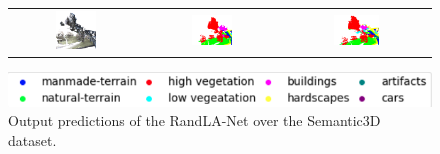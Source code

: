 \begin{figure}[h!]
\begin{tabular}{ccc}
            \includegraphics[width=0.33\textwidth, height=0.18\textheight]{images/seg_output/sem3d_seg_output/3_RGB.png} &
            \includegraphics[width=0.33\textwidth, height=0.18\textheight]{images/seg_output/sem3d_seg_output/3_GT.png}& 
            \includegraphics[width=0.33\textwidth, height=0.18\textheight]{images/seg_output/sem3d_seg_output/3_Pred.png}\\
        \end{tabular}
        \includegraphics[scale=0.65]{images/legend.png}
        \caption{Output predictions of the RandLA-Net over the Semantic3D dataset.}
    \end{figure}
